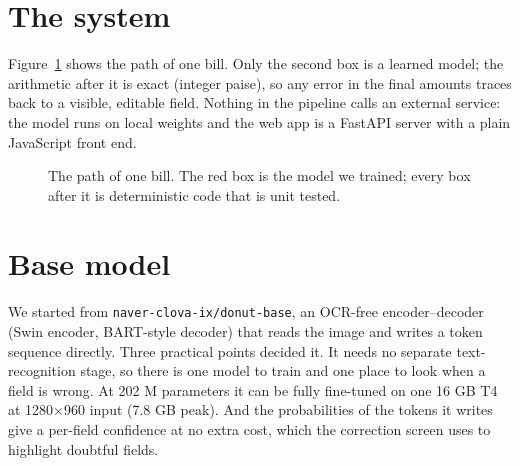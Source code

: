 \documentclass[10pt,a4paper]{article}
\begin{document}
\section{The system}\label{sec:sys}
Figure~\ref{fig:pipe} shows the path of one bill. Only the second box is a learned model; the arithmetic after it is exact (integer paise), so any error in the final amounts traces back to a visible, editable field. Nothing in the pipeline calls an external service: the model runs on local weights and the web app is a FastAPI server with a plain JavaScript front end.

\begin{figure}[!ht]
\centering
{}
\caption{The path of one bill. The red box is the model we trained; every box after it is deterministic code that is unit tested.}\label{fig:pipe}
\end{figure}

\section{Base model}\label{sec:base}
We started from \texttt{naver-clova-ix/donut-base}, an OCR-free encoder--decoder (Swin encoder, BART-style decoder) that reads the image and writes a token sequence directly. Three practical points decided it. It needs no separate text-recognition stage, so there is one model to train and one place to look when a field is wrong. At 202 M parameters it can be fully fine-tuned on one 16 GB T4 at 1280$\times$960 input (7.8 GB peak). And the probabilities of the tokens it writes give a per-field confidence at no extra cost, which the correction screen uses to highlight doubtful fields.
\end{document}
